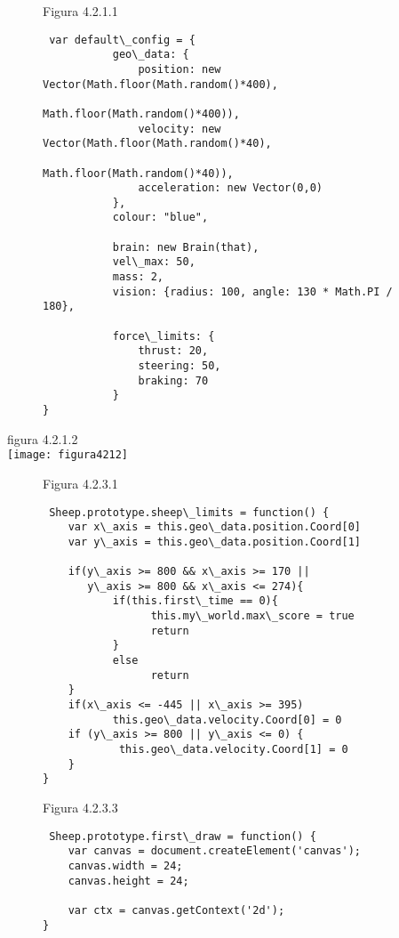 \begin{figure}
Figura 4.2.1.1 
\begin{verbatim}
 var default\_config = {
           geo\_data: {
               position: new Vector(Math.floor(Math.random()*400), 
                                    Math.floor(Math.random()*400)),
               velocity: new Vector(Math.floor(Math.random()*40),
                                    Math.floor(Math.random()*40)),
               acceleration: new Vector(0,0)
           },
           colour: "blue",

           brain: new Brain(that),
           vel\_max: 50,
           mass: 2,
           vision: {radius: 100, angle: 130 * Math.PI / 180},

           force\_limits: {
               thrust: 20,
               steering: 50,
               braking: 70
           }
}
\end{verbatim}
\end{figure}


figura 4.2.1.2\\
\texttt{[image: figura4212]}\\


\begin{figure}
Figura 4.2.3.1
\begin{verbatim}
 Sheep.prototype.sheep\_limits = function() {
    var x\_axis = this.geo\_data.position.Coord[0]
    var y\_axis = this.geo\_data.position.Coord[1]

    if(y\_axis >= 800 && x\_axis >= 170 || 
       y\_axis >= 800 && x\_axis <= 274){
           if(this.first\_time == 0){
                 this.my\_world.max\_score = true
                 return
           }
           else
                 return
    }
    if(x\_axis <= -445 || x\_axis >= 395)
           this.geo\_data.velocity.Coord[0] = 0
    if (y\_axis >= 800 || y\_axis <= 0) {
            this.geo\_data.velocity.Coord[1] = 0
    }
}
\end{verbatim}
\end{figure}


\begin{figure}
Figura 4.2.3.3
\begin{verbatim}
 Sheep.prototype.first\_draw = function() {
    var canvas = document.createElement('canvas');
    canvas.width = 24;
    canvas.height = 24;

    var ctx = canvas.getContext('2d');
}
\end{verbatim}
\end{figure}


